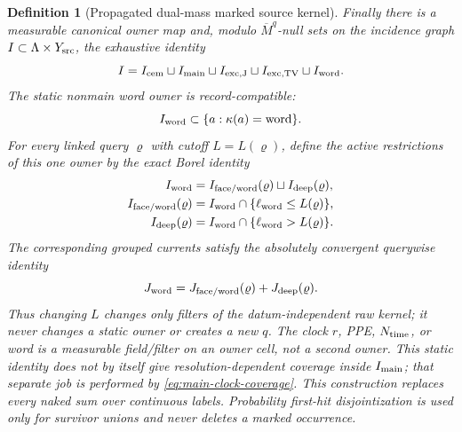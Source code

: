 \documentclass[11pt]{article}
\newtheorem{definition}[theorem]{Definition}
\begin{document}
\begin{definition}[Propagated dual-mass marked source kernel]
Finally there is a measurable canonical owner map and, modulo
$\overline M^{q}$-null sets on the incidence graph
$I\subset\Lambda\times Y_{\rm src}$, the exhaustive identity
\begin{equation}
\label{eq:exhaustive-source-owner-partition}
 I=I_{\rm cem}\sqcup I_{\rm main}\sqcup
 I_{\rm exc,J}\sqcup I_{\rm exc,TV}\sqcup
 I_{\rm word}.
\end{equation}
The static nonmain word owner is record-compatible:
\begin{equation}
\label{eq:nonmain-word-handler-record-compatibility}
 I_{\rm word}\subset\{a:\kappa(a)={\rm word}\}.
\end{equation}
For every linked query $\varrho$ with cutoff $L=L(\varrho)$, define the
active restrictions of this one owner by the exact Borel identity
\begin{equation}
\label{eq:nonmain-word-query-coverage}
\begin{aligned}
 I_{\rm word}
 &=I_{\rm face/word}(\varrho)\sqcup I_{\rm deep}(\varrho),\\
 I_{\rm face/word}(\varrho)
 &=I_{\rm word}\cap\{\ell_{\rm word}\le L(\varrho)\},\\
 I_{\rm deep}(\varrho)
 &=I_{\rm word}\cap\{\ell_{\rm word}>L(\varrho)\}.
\end{aligned}
\end{equation}
The corresponding grouped currents satisfy the absolutely convergent
querywise identity
\begin{equation}
\label{eq:nonmain-word-query-current-identity}
 J_{\rm word}=J_{\rm face/word}(\varrho)+J_{\rm deep}(\varrho).
\end{equation}
Thus changing $L$ changes only filters of the datum-independent raw kernel;
it never changes a static owner or creates a new $q$.
The clock $r$, PPE, $N_{\rm time}$, or word is a measurable field/filter on
an owner cell, not a second owner.  This static identity does not by itself
give resolution-dependent coverage inside $I_{\rm main}$; that separate job
is performed by \eqref{eq:main-clock-coverage}.  This construction replaces every
naked sum over continuous labels.  Probability first-hit disjointization is
used only for survivor unions and never deletes a marked occurrence.
\end{definition}
\end{document}
